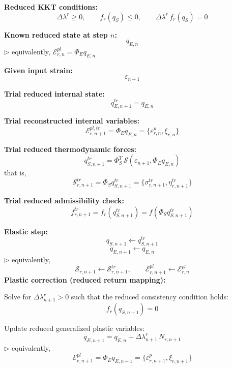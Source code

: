 \documentclass[11pt,a4paper]{article}
\begin{document}
\begin{algorithmic}[1]
\State \textbf{Reduced KKT conditions:}
\[
\Delta\lambda^r \ge 0,
\qquad
f_r(q_S)\le 0,
\qquad
\Delta\lambda^r\,f_r(q_S)=0
\]

\State \textbf{Known reduced state at step $n$:}
\[
q_{E,n}
\]
\Statex \hspace{\algorithmicindent}
$\triangleright$ equivalently, $\mathcal E_{r,n}^{pl}=\Phi_E q_{E,n}$


    \State \textbf{Given input strain:}
    \[
    \varepsilon_{n+1}
    \]

    \State \textbf{Trial reduced internal state:}
    \[
    q_{E,n+1}^{tr}=q_{E,n}
    \]

    \State \textbf{Trial reconstructed internal variables:}
    \[
    \mathcal E_{r,n+1}^{pl,tr}
    =
    \Phi_E q_{E,n}
    =
    \{\varepsilon_{r,n}^{p},\xi_{r,n}\}
    \]

    \State \textbf{Trial reduced thermodynamic forces:}
    \[
    q_{S,n+1}^{tr}
    =
    \Phi_S^T\,\mathcal S(\varepsilon_{n+1},\Phi_E q_{E,n})
    \]
    that is,
    \[
    \mathcal S_{r,n+1}^{tr}
    =
    \Phi_S q_{S,n+1}^{tr}
    =
    \{\sigma_{r,n+1}^{tr},\eta_{r,n+1}^{tr}\}
    \]

    \State \textbf{Trial reduced admissibility check:}
    \[
    f_{r,n+1}^{tr}
    =
    f_r(q_{S,n+1}^{tr})
    =
    f(\Phi_S q_{S,n+1}^{tr})
    \]

        \State \textbf{Elastic step:}
        \[
        q_{S,n+1}\gets q_{S,n+1}^{tr}
        \]
        \[
        q_{E,n+1}\gets q_{E,n}
        \]
        \Statex \hspace{\algorithmicindent}
        $\triangleright$ equivalently,
        \[
        \mathcal S_{r,n+1}\gets \mathcal S_{r,n+1}^{tr},
        \qquad
        \mathcal E_{r,n+1}^{pl}\gets \mathcal E_{r,n}^{pl}
        \]
    \Else
        \State \textbf{Plastic correction (reduced return mapping):}

        \State Solve for $\Delta\lambda_{n+1}^r>0$ such that the reduced consistency condition holds:
        \[
        f_r(q_{S,n+1})=0
        \]

        \State Update reduced generalized plastic variables:
        \[
        q_{E,n+1}
        =
        q_{E,n}
        +
        \Delta\lambda_{n+1}^r\,N_{r,n+1}
        \]
        \Statex \hspace{\algorithmicindent}
        $\triangleright$ equivalently,
        \[
        \mathcal E_{r,n+1}^{pl}
        =
        \Phi_E q_{E,n+1}
        =
        \{\varepsilon_{r,n+1}^{p},\xi_{r,n+1}\}
        \]


\end{algorithmic}
\end{document}
